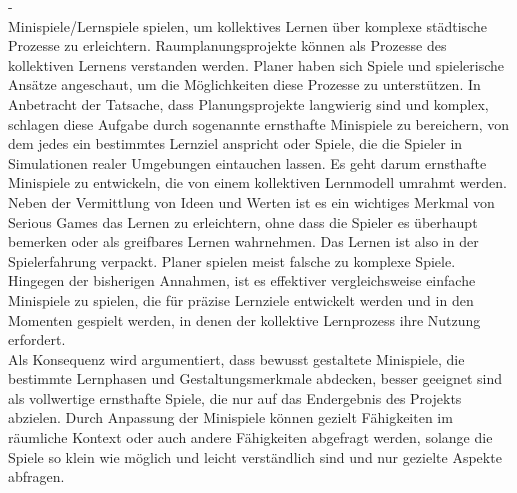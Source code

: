 -\cite{devisch2018mini}\\
Minispiele/Lernspiele spielen, um kollektives Lernen über komplexe städtische Prozesse zu erleichtern. Raumplanungsprojekte können als Prozesse des kollektiven Lernens verstanden werden. Planer haben sich Spiele und spielerische Ansätze angeschaut, um die Möglichkeiten diese Prozesse zu unterstützen. In Anbetracht der Tatsache, dass Planungsprojekte langwierig sind und komplex, schlagen diese Aufgabe durch sogenannte ernsthafte Minispiele zu bereichern, von dem jedes ein bestimmtes Lernziel anspricht oder Spiele, die die Spieler in Simulationen realer Umgebungen eintauchen lassen. Es geht darum ernsthafte Minispiele zu entwickeln, die von einem kollektiven Lernmodell umrahmt werden.\\ 
Neben der Vermittlung von Ideen und Werten ist es ein wichtiges Merkmal von Serious Games das Lernen zu erleichtern, ohne dass die Spieler es überhaupt bemerken oder als greifbares Lernen wahrnehmen. Das Lernen ist also in der Spielerfahrung verpackt. Planer spielen meist falsche zu komplexe Spiele. Hingegen der bisherigen Annahmen, ist es effektiver vergleichsweise einfache Minispiele zu spielen, die für präzise Lernziele entwickelt werden und in den Momenten gespielt werden, in denen der kollektive Lernprozess ihre Nutzung erfordert.\\
Als Konsequenz wird argumentiert, dass bewusst gestaltete Minispiele, die bestimmte Lernphasen und Gestaltungsmerkmale abdecken, besser geeignet sind als vollwertige ernsthafte Spiele, die nur auf das Endergebnis des Projekts abzielen. Durch Anpassung der Minispiele können gezielt Fähigkeiten im räumliche Kontext oder auch andere Fähigkeiten abgefragt werden, solange die Spiele so klein wie möglich und leicht verständlich sind und nur gezielte Aspekte abfragen.